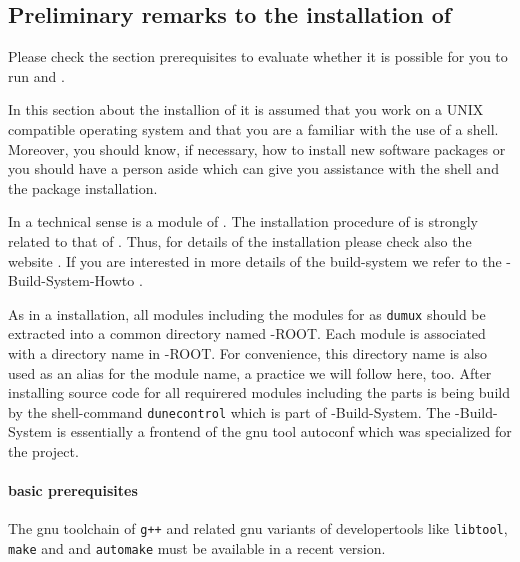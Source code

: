\subsection{Preliminary remarks to the installation of \Dumux}

Please check the section prerequisites to evaluate whether it is possible for you to run \Dune and \Dumux.

In this section about the installion of \Dumux it is assumed that you work on a UNIX compatible operating system and that you are a familiar with the use of a shell. Moreover, you should know,  if necessary, how to install
new software packages or you should have a person aside which can give you assistance with the shell and
the package installation.

In a technical sense \Dumux is a module of \Dune. The installation procedure of \Dumux is strongly related to 
that of \Dune.  Thus, for details of the installation please check also the {\Dune} website \cite{DUNE-HP}. If you are interested in more details of the build-system we refer to the {\Dune}-Build-System-Howto \cite{DUNE-HP}.

As in a \Dune installation, all \Dune modules including the modules for \Dumux as \texttt{dumux} should be extracted into a common directory named {\Dune}-ROOT. Each \Dune module is associated with a directory name in {\Dune}-ROOT. For convenience, this directory name is  also used as an alias for the module name, a practice we will follow here, too.
After installing source code for all requirered \Dune modules including the \Dumux parts
\Dune is being build by the shell-command \texttt{dunecontrol} which is part of {\Dune}-Build-System. The {\Dune}-Build-System is essentially a frontend of the gnu tool autoconf which was specialized for the \Dune project.

\paragraph{basic prerequisites}
The gnu toolchain of \texttt{g++}  and related gnu variants of developertools like \texttt{libtool}, \texttt{make} and
and \texttt{automake} must be available in a recent version.

% 

